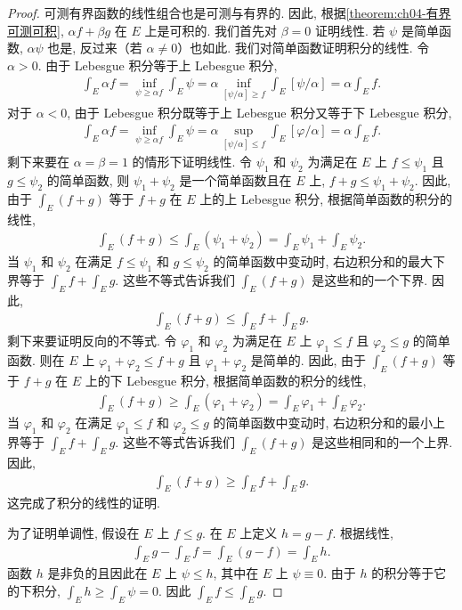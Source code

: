 \documentclass[../../main.tex]{subfiles}
\begin{document}
\begin{proof}
可测有界函数的线性组合也是可测与有界的. 因此, 根据\cref{theorem:ch04-有界可测可积}, $\alpha f+\beta g$ 在 $E$ 上是可积的. 我们首先对 $\beta=0$ 证明线性. 若 $\psi$ 是简单函数, $\alpha\psi$ 也是, 反过来（若 $\alpha\neq 0$）也如此. 我们对简单函数证明积分的线性. 令 $\alpha>0$. 由于 Lebesgue 积分等于上 Lebesgue 积分,
\begin{align*}
\int_{E}\alpha f=\inf_{\psi\geqslant\alpha f}\int_{E}\psi=\alpha\inf_{[\psi/\alpha]\geqslant f}\int_{E}[\psi/\alpha]=\alpha\int_{E}f.
\end{align*}
对于 $\alpha<0$, 由于 Lebesgue 积分既等于上 Lebesgue 积分又等于下 Lebesgue 积分,
\begin{align*}
\int_{E}\alpha f=\inf_{\psi\geqslant\alpha f}\int_{E}\psi=\alpha\sup_{[\psi/\alpha]\leqslant f}\int_{E}[\varphi/\alpha]=\alpha\int_{E}f.
\end{align*}
剩下来要在 $\alpha=\beta=1$ 的情形下证明线性. 令 $\psi_{1}$ 和 $\psi_{2}$ 为满足在 $E$ 上 $f\leqslant\psi_{1}$ 且 $g\leqslant\psi_{2}$ 的简单函数, 则 $\psi_{1}+\psi_{2}$ 是一个简单函数且在 $E$ 上, $f+g\leqslant\psi_{1}+\psi_{2}$. 因此, 由于 $\int_{E}(f+g)$ 等于 $f+g$ 在 $E$ 上的上 Lebesgue 积分, 根据简单函数的积分的线性,
\begin{align*}
\int_{E}(f+g)\leqslant\int_{E}(\psi_{1}+\psi_{2})=\int_{E}\psi_{1}+\int_{E}\psi_{2}.
\end{align*}
当 $\psi_{1}$ 和 $\psi_{2}$ 在满足 $f\leqslant\psi_{1}$ 和 $g\leqslant\psi_{2}$ 的简单函数中变动时, 右边积分和的最大下界等于 $\int_{E}f+\int_{E}g$. 这些不等式告诉我们 $\int_{E}(f+g)$ 是这些和的一个下界. 因此,
\begin{align*}
\int_{E}(f+g)\leqslant\int_{E}f+\int_{E}g.
\end{align*}
剩下来要证明反向的不等式. 令 $\varphi_{1}$ 和 $\varphi_{2}$ 为满足在 $E$ 上 $\varphi_{1}\leqslant f$ 且 $\varphi_{2}\leqslant g$ 的简单函数. 则在 $E$ 上 $\varphi_{1}+\varphi_{2}\leqslant f+g$ 且 $\varphi_{1}+\varphi_{2}$ 是简单的. 因此, 由于 $\int_{E}(f+g)$ 等于 $f+g$ 在 $E$ 上的下 Lebesgue 积分, 根据简单函数的积分的线性,
\begin{align*}
\int_{E}(f+g)\geqslant\int_{E}(\varphi_{1}+\varphi_{2})=\int_{E}\varphi_{1}+\int_{E}\varphi_{2}.
\end{align*}
当 $\varphi_{1}$ 和 $\varphi_{2}$ 在满足 $\varphi_{1}\leqslant f$ 和 $\varphi_{2}\leqslant g$ 的简单函数中变动时, 右边积分和的最小上界等于 $\int_{E}f+\int_{E}g$. 这些不等式告诉我们 $\int_{E}(f+g)$ 是这些相同和的一个上界. 因此,
\begin{align*}
\int_{E}(f+g)\geqslant\int_{E}f+\int_{E}g.
\end{align*}
这完成了积分的线性的证明.

为了证明单调性, 假设在 $E$ 上 $f\leqslant g$. 在 $E$ 上定义 $h=g-f$. 根据线性,
\begin{align*}
\int_{E}g-\int_{E}f=\int_{E}(g-f)=\int_{E}h.
\end{align*}
函数 $h$ 是非负的且因此在 $E$ 上 $\psi\leqslant h$, 其中在 $E$ 上 $\psi\equiv 0$. 由于 $h$ 的积分等于它的下积分, $\int_{E}h\geqslant\int_{E}\psi=0$. 因此 $\int_{E}f\leqslant\int_{E}g$.
\end{proof}
\end{document}
